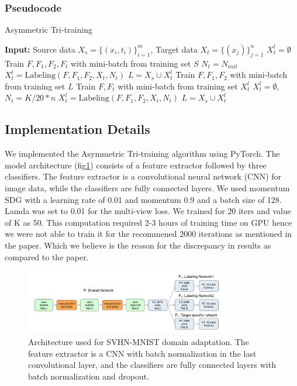 \documentclass{article}
\begin{document}
\subsubsection*{Pseudocode}
\begin{algorithm}
\caption{Asymmetric Tri-training}
\begin{algorithmic}[1]
\STATE \textbf{Input:} Source data $X_s = \{(x_i, t_i)\}_{i=1}^m$, Target data $X_t = \{(x_j)\}_{j=1}^n$
\STATE $X_t^l = \emptyset$ 
  \STATE Train $F, F_1, F_2, F_t$ with mini-batch from training set $S$
\ENDFOR
\STATE $N_t = N_{init}$
\STATE $X_t^l = \text{Labeling}(F, F_1, F_2, X_t, N_t)$
\STATE $L = X_s \cup X_t^l$
    \STATE Train $F, F_1, F_2$ with mini-batch from training set $L$
    \STATE Train $F, F_t$ with mini-batch from training set $X_t^l$
  \ENDFOR
  \STATE $X_t^l = \emptyset$, $N_t = K/20 * n$
  \STATE $X_t^l = \text{Labeling}(F, F_1, F_2, X_t, N_t)$
  \STATE $L = X_s \cup X_t^l$
\ENDFOR
\end{algorithmic}
\end{algorithm}

\subsection*{Implementation Details}
We implemented the Asymmetric Tri-training algorithm using PyTorch. The model architecture (fig\ref{fig:att_implementation}) consists of a feature extractor followed by three classifiers. The feature extractor is a convolutional neural network (CNN) for image data, while the classifiers are fully connected layers. We used momentum SDG with a learning rate of 0.01 and momentum 0.9 and a batch size of 128. Lamda was set to 0.01 for the multi-view loss. We trained for 20 iters and value of K as 50. This computation required 2-3 hours of training time on GPU hence we were not able to train it for the recommened 2000 iterations as mentioned in the paper. Which we believe is the reason for the discrepancy in results as compared to the paper.
\begin{figure}[h]
  \centering
  \includegraphics[width=0.8\textwidth]{ATT/Imp_acc.png}
  \caption{Architecture used for SVHN-MNIST domain adaptation. The feature extractor is a CNN with batch normalization in the last convolutional layer, and the classifiers are fully connected layers with batch normalization and dropout.}
  \label{fig:att_implementation}
\end{figure}
\end{document}
